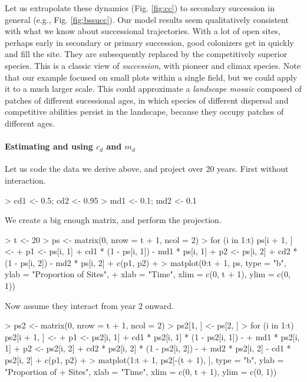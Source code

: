 Let us extrapolate these dynamics (Fig. \ref{fig:cc}) to secondary succession in general (e.g., Fig. \ref{fig:bssucc}). Our model results seem qualitatively consistent with what we know about successional trajectories. With a lot of open sites, perhaps early in secondary or primary succession, good colonizers get in quickly and fill the site. They are subsequently replaced by the competitively superior species. This is a classic view of \emph{succession}, with pioneer and climax species. Note that our example focused on small plots within a single field, but we could apply it to a much larger scale. This could approximate a \emph{landscape mosaic} composed of patches of different sucessional ages, in which species of different dispersal and competitive abilities persist in the landscape, because they occupy patches of different ages. 


\medskip \noindent
\begin{boxedminipage}{\linewidth}
  {\footnotesize
\paragraph{Estimating and using $c_d$ and $m_d$} 
Let us code the data we derive above, and project over 20 years. First without interaction.
\begin{Schunk}
\begin{Sinput}
> cd1 <- 0.5;  cd2 <- 0.95
> md1 <- 0.1;  md2 <- 0.1
\end{Sinput}
\end{Schunk}
We create a big enough matrix, and perform the projection.
\begin{Schunk}
\begin{Sinput}
> t <- 20
> ps <- matrix(0, nrow = t + 1, ncol = 2)
> for (i in 1:t) ps[i + 1, ] <- {
+     p1 <- ps[i, 1] + cd1 * (1 - ps[i, 1]) - md1 * ps[i, 1]
+     p2 <- ps[i, 2] + cd2 * (1 - ps[i, 2]) - md2 * ps[i, 2]
+     c(p1, p2)
+ }
> matplot(0:t + 1, ps, type = "b", ylab = "Proportion of Sites", 
+     xlab = "Time", xlim = c(0, t + 1), ylim = c(0, 1))
\end{Sinput}
\end{Schunk}
Now assume they interact from year 2 onward.
\begin{Schunk}
\begin{Sinput}
> ps2 <- matrix(0, nrow = t + 1, ncol = 2)
> ps2[1, ] <- ps[2, ]
> for (i in 1:t) ps2[i + 1, ] <- {
+     p1 <- ps2[i, 1] + cd1 * ps2[i, 1] * (1 - ps2[i, 1]) - 
+         md1 * ps2[i, 1]
+     p2 <- ps2[i, 2] + cd2 * ps2[i, 2] * (1 - ps2[i, 2]) - 
+         md2 * ps2[i, 2] - cd1 * ps2[i, 2]
+     c(p1, p2)
+ }
> matplot(1:t + 1, ps2[-(t + 1), ], type = "b", ylab = "Proportion of 
+     Sites", xlab = "Time", xlim = c(0, t + 1), ylim = c(0, 1))
\end{Sinput}
\end{Schunk}
}
\end{boxedminipage} \medskip

